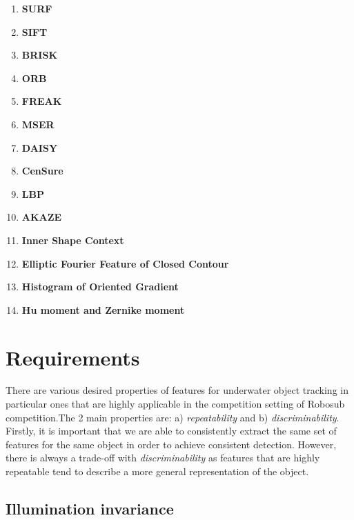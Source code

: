 \documentclass[fypca]{socreport}
\begin{document}
\begin{enumerate}
  \item \textbf{SURF} 
  \item \textbf{SIFT} 
  \item \textbf{BRISK} 
  \item \textbf{ORB} 
  \item \textbf{FREAK} 
  \item \textbf{MSER} 
  \item \textbf{DAISY} 
  \item \textbf{CenSure} 
  \item \textbf{LBP} 
  \item \textbf{AKAZE} 
  \item \textbf{Inner Shape Context} 
  \item \textbf{Elliptic Fourier Feature of Closed Contour} 
  \item \textbf{Histogram of Oriented Gradient} 
  \item \textbf{Hu moment and Zernike moment} 
\end{enumerate}

\section{Requirements}

There are various desired properties of features for underwater object tracking
in particular ones that are highly applicable in the competition setting of
Robosub competition.The 2 main properties are: a) \textit{repeatability} and b)
\textit{discriminability}. Firstly, it is important that we are able to
consistently extract the same set of features for the same object in order to
achieve consistent detection. However, there is always a trade-off with
\textit{discriminability} as features that are highly repeatable tend to
describe a more general representation of the object.

\subsection{Illumination invariance}
\end{document}
